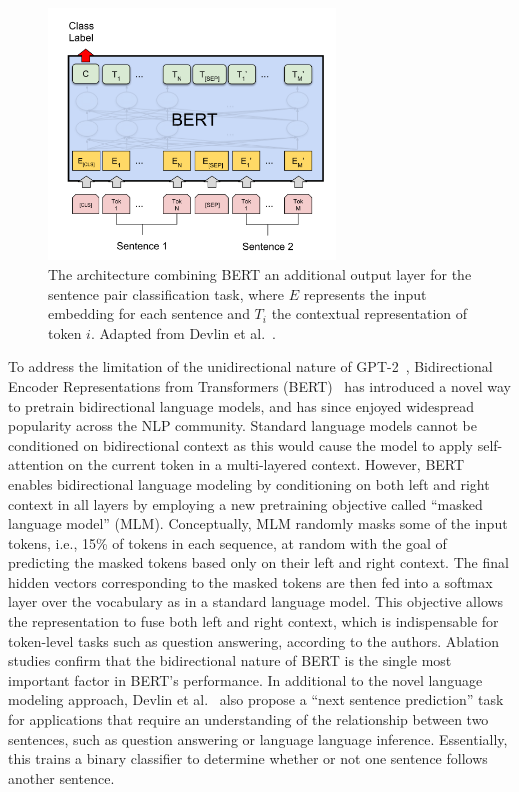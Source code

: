 \begin{figure}[b!]
\centering
  \includegraphics[width=3in]{bert.png}
\caption{The architecture combining BERT an additional output layer for the sentence pair classification task, where $ E $ represents the input embedding for each sentence and $ T_i $ the contextual representation of token $ i $. Adapted from Devlin et al.~\cite{devlin2018bert}.}
\label{fig:bert}
\end{figure}

To address the limitation of the unidirectional nature of GPT-2~\cite{radford2019language}, Bidirectional Encoder Representations from Transformers (BERT)~\cite{devlin2018bert} has introduced a novel way to pretrain bidirectional language models, and has since enjoyed widespread popularity across the NLP community.
Standard language models cannot be conditioned on bidirectional context as this would cause the model to apply self-attention on the current token in a multi-layered context.
However, BERT enables bidirectional language modeling by conditioning on both left and right context in all layers by employing a new pretraining objective called ``masked language model'' (MLM).
Conceptually, MLM randomly masks some of the input tokens, i.e., 15\% of tokens in each sequence, at random with the goal of predicting the masked tokens based only on their left and right context.
The final hidden vectors corresponding to the masked tokens are then fed into a softmax layer over the vocabulary as in a standard language model.
This objective allows the representation to fuse both left and right context, which is indispensable for token-level tasks such as question answering, according to the authors.
Ablation studies confirm that the bidirectional nature of BERT is the single most important factor in BERT's performance.
In additional to the novel language modeling approach, Devlin et al.~\cite{devlin2018bert} also propose a ``next sentence prediction'' task for applications that require an understanding of the relationship between two sentences, such as question answering or language language inference.
Essentially, this trains a binary classifier to determine whether or not one sentence follows another sentence.

